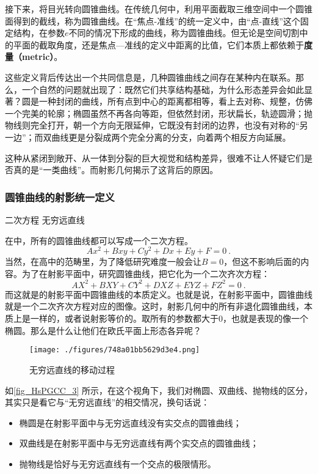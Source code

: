 接下来，将目光转向圆锥曲线。在传统几何中，利用平面截取三维空间中一个圆锥面得到的截线，称为圆锥曲线。在“焦点-准线”的统一定义中，由“点-直线”这个固定结构，在参数$e$不同的情况下形成的曲线，称为圆锥曲线。但无论是空间切割中的平面的截取角度，还是焦点—准线的定义中距离的比值，它们本质上都依赖于\textbf{度量（metric）}。

这些定义背后传达出一个共同信息是，几种圆锥曲线之间存在某种内在联系。那么，一个自然的问题就出现了：既然它们共享结构基础，为什么形态差异会如此显著？圆是一种封闭的曲线，所有点到中心的距离都相等，看上去对称、规整，仿佛一个完美的轮廓；椭圆虽然不再各向等距，但依然封闭，形状扁长，轨迹圆滑；抛物线则完全打开，朝一个方向无限延伸，它既没有封闭的边界，也没有对称的“另一边”；而双曲线更是分裂成两个完全分离的分支，向着两个相反方向延展。

这种从紧闭到敞开、从一体到分裂的巨大视觉和结构差异，很难不让人怀疑它们是否真的是“一类曲线”。而射影几何揭示了这背后的原因。

\subsubsection{圆锥曲线的射影统一定义}

二次方程
无穷远直线

在中，所有的圆锥曲线都可以写成一个二次方程。
\begin{equation}
Ax^2+Bxy+Cy^2+Dx+Ey+F=0~.
\end{equation}
当然，在高中的范畴里，为了降低研究难度一般会让$B=0$，但这不影响后面的内容。为了在射影平面中，研究圆锥曲线，把它化为一个二次齐次方程：
\begin{equation}
AX^2 + BXY + CY^2 + DXZ + EYZ + FZ^2 = 0~.
\end{equation}
而这就是的射影平面中圆锥曲线的本质定义。也就是说，在射影平面中，圆锥曲线就是一个二次齐次方程对应的图像。这时，射影几何中的所有非退化圆锥曲线，本质上是一样的，或者说射影等价的。取所有的参数都大于0，也就是表现的像一个椭圆。那么是什么让他们在欧氏平面上形态各异呢？

\begin{figure}[ht]
\centering
\texttt{[image: ./figures/748a01bb5629d3e4.png]}
\caption{无穷远直线的移动过程} \label{fig_HsPGCC_3}
\end{figure}

如\autoref{fig_HsPGCC_3} 所示，在这个视角下，我们对椭圆、双曲线、抛物线的区分，其实只是看它与“无穷远直线”的相交情况，换句话说：
\begin{itemize}
\item 椭圆是在射影平面中与无穷远直线没有实交点的圆锥曲线；
\item 双曲线是在射影平面中与无穷远直线有两个实交点的圆锥曲线；
\item 抛物线是恰好与无穷远直线有一个交点的极限情形。
\end{itemize}

